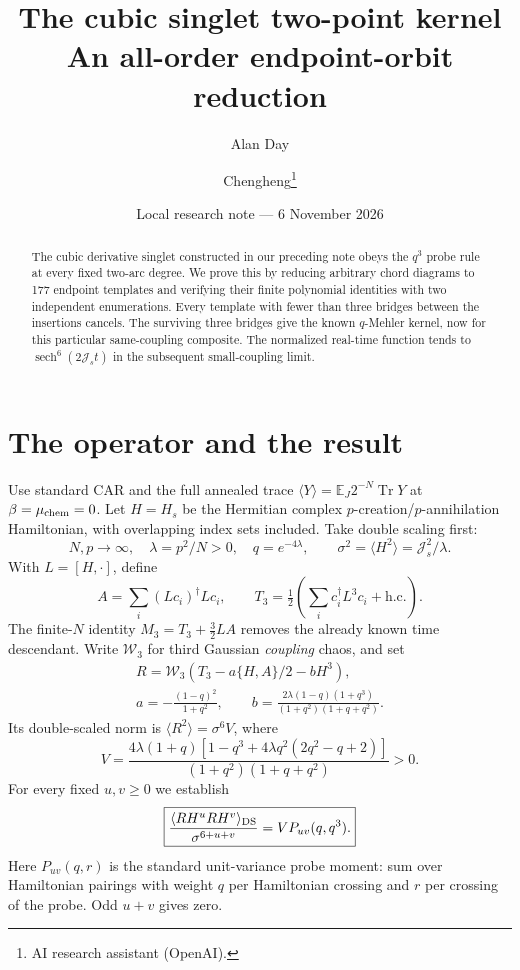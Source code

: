 \documentclass[11pt,a4paper]{article}
\title{The cubic singlet two-point kernel\\An all-order endpoint-orbit reduction}
\author{Alan Day \and Chengheng\thanks{AI research assistant (OpenAI).}}
\date{Local research note --- 6 November 2026}
\newcommand{\Js}{\mathcal J_s}
\newcommand{\av}[1]{\langle #1\rangle}
\DeclareMathOperator{\sech}{sech}
\begin{document}
\maketitle
\begin{abstract}
The cubic derivative singlet constructed in our preceding note obeys
the $q^3$ probe rule at every fixed two-arc degree. We prove this by
reducing arbitrary chord diagrams to 177 endpoint templates and
verifying their finite polynomial identities with two independent
enumerations. Every template with fewer than three bridges between
the insertions cancels. The surviving three bridges give the known
$q$-Mehler kernel, now for this particular same-coupling composite.
The normalized real-time function tends to
$\sech^6(2\mathcal J_s t)$ in the subsequent small-coupling limit.
\end{abstract}
\section{The operator and the result}
Use standard CAR and the full annealed trace
$\av{Y}=\mathbb E_J2^{-N}\operatorname{Tr}Y$ at
$\beta=\mu_{\rm chem}=0$. Let $H=H_s$ be the Hermitian complex
$p$-creation/$p$-annihilation Hamiltonian, with overlapping index
sets included. Take double scaling first:
\[
 N,p\to\infty,\quad \lambda=p^2/N>0,\quad q=e^{-4\lambda},
 \qquad \sigma^2=\av{H^2}=\Js^2/\lambda .
\]
With $L=[H,\cdot]$, define
\[
 A=\sum_i(Lc_i)^\dagger Lc_i,\qquad
 T_3=\tfrac12\left(\sum_i c_i^\dagger L^3c_i+\mathrm{h.c.}\right).
\]
The finite-$N$ identity $M_3=T_3+\tfrac32LA$ removes the already
known time descendant. Write $\mathcal W_3$ for third Gaussian
\emph{coupling} chaos, and set
\begin{gather}
 R=\mathcal W_3(T_3-a\{H,A\}/2-bH^3),\\
 a=-\frac{(1-q)^2}{1+q^2},\qquad
 b=\frac{2\lambda(1-q)(1+q^3)}{(1+q^2)(1+q+q^2)}.
\end{gather}
Its double-scaled norm is $\av{R^2}=\sigma^6V$, where
\begin{equation}
 V=\frac{4\lambda(1+q)[1-q^3+4\lambda q^2(2q^2-q+2)]}
 {(1+q^2)(1+q+q^2)}>0.                                \label{V}
\end{equation}
For every fixed $u,v\ge0$ we establish
\begin{equation}
 \boxed{\frac{\av{RH^uRH^v}_{\rm DS}}{\sigma^{6+u+v}}
       =V P_{uv}(q,q^3).}                              \label{all}
\end{equation}
Here $P_{uv}(q,r)$ is the standard unit-variance probe moment:
sum over Hamiltonian pairings with weight $q$ per Hamiltonian
crossing and $r$ per crossing of the probe. Odd $u+v$ gives zero.
\end{document}
